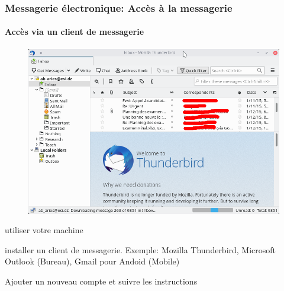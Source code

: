 \documentclass[xcolor=table]{beamer}
\begin{document}
\begin{frame}
\frametitle{Messagerie électronique: Accès à la messagerie}
\framesubtitle{Accès via un client de messagerie}

\begin{figure}
	\vspace{-1cm}
	\includegraphics[width=.60\textwidth]{..//img/Bweb02-ri-gmail/thunderbird4.png}
\end{figure}

\mysphere utiliser votre machine

\mysphere installer un client de messagerie. Exemple: Mozilla Thunderbird, Microsoft Outlook (Bureau), Gmail pour Andoid (Mobile)

\mysphere Ajouter un nouveau compte et suivre les instructions 


\end{frame}
\end{document}
